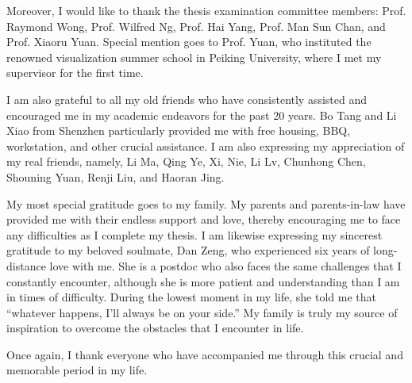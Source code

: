 Moreover, I would like to thank the thesis examination committee members: Prof. Raymond Wong, Prof. Wilfred Ng, Prof. Hai Yang, Prof. Man Sun Chan, and Prof. Xiaoru Yuan. Special mention goes to Prof. Yuan, who instituted the renowned visualization summer school in Peiking University, where I met my supervisor for the first time.  

I am also grateful to all my old friends who have consistently assisted and encouraged me in my academic endeavors for the past 20 years. Bo Tang and Li Xiao from Shenzhen particularly provided me with free housing, BBQ, workstation, and other crucial assistance. I am also expressing my appreciation of my real friends, namely, Li Ma, Qing Ye, Xi, Nie, Li Lv, Chunhong Chen, Shouning Yuan, Renji Liu, and Haoran Jing.

My most special gratitude goes to my family. My parents and parents-in-law have provided me with their endless support and love, thereby encouraging me to face any difficulties as I complete my thesis. I am likewise expressing my sincerest gratitude to my beloved soulmate, Dan Zeng, who experienced six years of long-distance love with me. She is a postdoc who also faces the same challenges that I constantly encounter, although she is more patient and understanding than I am in times of difficulty. During the lowest moment in my life, she told me that “whatever happens, I’ll always be on your side.” My family is truly my source of inspiration to overcome the obstacles that I encounter in life.

Once again, I thank everyone who have accompanied me through this crucial and memorable period in my life.


\endacknowledgments
